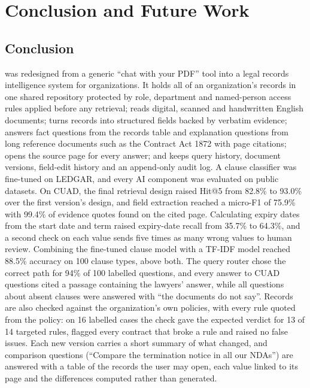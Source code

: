 \chapter{Conclusion and Future Work}

\section{Conclusion}
\sysname{} was redesigned from a generic ``chat with your PDF'' tool into a legal records intelligence
system for organizations. It holds all of an organization's records in one shared repository protected
by role, department and named-person access rules applied before any retrieval; reads digital, scanned
and handwritten English documents; turns records into structured fields backed by verbatim evidence;
answers fact questions from the records table and explanation questions from long reference documents
such as the Contract Act 1872 with page citations; opens the source page for every answer; and keeps
query history, document versions, field-edit history and an append-only audit log. A clause classifier
was fine-tuned on LEDGAR, and every AI component was evaluated on public datasets. On CUAD, the final
retrieval design raised Hit@5 from 82.8\% to 93.0\% over the first version's design, and field
extraction reached a micro-F1 of 75.9\% with 99.4\% of evidence quotes found on the cited page. Calculating expiry dates from the start date and term raised expiry-date recall from 35.7\% to 64.3\%, and a second check on each value sends five times as many wrong values to human review. Combining the fine-tuned clause model with a TF-IDF model reached 88.5\% accuracy on 100 clause types, above both. The query router chose the correct path for 94\% of 100 labelled questions, and every answer to CUAD questions cited a passage containing the lawyers' answer, while all questions about absent clauses were answered with ``the documents do not say''. Records are
also checked against the organization's own policies, with every rule quoted from the policy: on 16
labelled cases the check gave the expected verdict for 13 of 14 targeted rules, flagged every contract that
broke a rule and raised no false issues. Each new version carries a short summary of what changed, and
comparison questions (``Compare the termination notice in all our NDAs'') are answered with a table of the
records the user may open, each value linked to its page and the differences computed rather than
generated.

